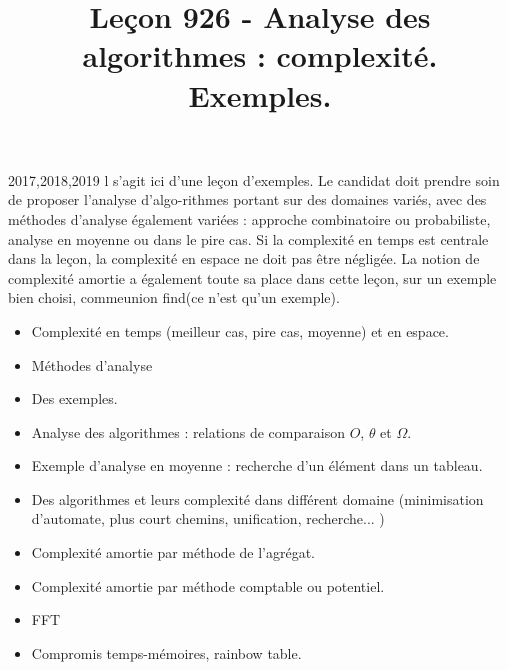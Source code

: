 \documentclass{agregfiche}
\title{Leçon 926 - Analyse des algorithmes : complexité. Exemples.}
\begin{document}
\maketitle

\secrapports
\begin{rapport}{2017,2018,2019}
l s’agit ici d’une leçon d’exemples. Le candidat doit prendre soin de proposer l’analyse d’algo-rithmes portant sur des domaines variés, avec des méthodes d’analyse également variées : approche combinatoire ou probabiliste, analyse en moyenne ou dans le pire cas. Si la complexité en temps est centrale dans la leçon, la complexité en espace ne doit pas être négligée. La notion de complexité amortie a également toute sa place dans cette leçon, sur un exemple bien choisi, commeunion find(ce n’est qu’un exemple).
\end{rapport}

\secindispensables

\begin{itemize}
        \item Complexité en temps (meilleur cas, pire cas, moyenne)
        et en espace.
	\item Méthodes d'analyse
    \item Des exemples.
\end{itemize}

\secasavoir

\begin{itemize}
	\item Analyse des algorithmes : relations de comparaison $O$, $\theta$ et $\Omega$.
    \item Exemple d’analyse en moyenne : recherche d’un élément dans un tableau.
    \item Des algorithmes et leurs complexité dans différent domaine (minimisation d'automate, plus court chemins, unification, recherche... )
    	\item Complexité amortie par méthode de l'agrégat.

\end{itemize}

\secidees

\begin{itemize}
    	\item Complexité amortie par méthode comptable ou potentiel.
        \item FFT
        \item Compromis temps-mémoires, rainbow table.
\end{itemize}
\end{document}
